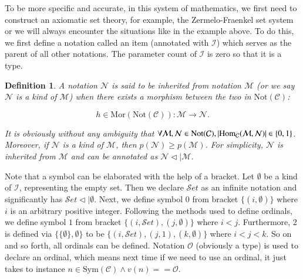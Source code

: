 \documentclass{aims}
\numberwithin{equation}{section}
\newtheorem{definition}{Definition}	%
\numberwithin{theorem}{section}	%
\numberwithin{axiom}{section}	%
\numberwithin{definition}{section}	%
\begin{document}
	To be more specific and accurate, in this system of mathematics, we first need to construct an axiomatic set theory, for example, the Zermelo-Fraenkel set system or we will always encounter the situations like in the example above. To do this, we first define a notation called an item (annotated with \(\mathcal{I}\)) which serves as the parent of all other notations. The parameter count of \(\mathcal{I}\) is zero so that it is a type.
	
	\begin{definition}
		A notation \(\mathcal{N}\) is said to be{ inherited} from notation \(\mathcal{M}\) (or we say \(\mathcal{N}\) is{ a kind of} \(\mathcal{M}\)) when there exists a morphism between the two in \(\text{Not}(\mathcal{C})\):
		
		\begin{equation}
			h\in \text{Mor}(\text{Not}(\mathcal{C})): \mathcal{M}\to \mathcal{N}.
		\end{equation}
		
		It is obviously without any ambiguity that \(\forall \mathcal{M},\mathcal{N}\in \text{Not}(\mathcal{C}),\left|\text{Hom}_{\mathcal{C}}(\mathcal{M},\mathcal{N})\right|$ $\in \{0,1\}\). Moreover, if \(\mathcal{N}\) is a kind of \(\mathcal{M}\), then \(\mathit{p}(\mathcal{N})\geq \mathit{p}(\mathcal{M})\). For simplicity, \(\mathcal{N}\) is inherited from \(\mathcal{M}\) and can be annotated as \(\mathcal{N}\triangleleft |\mathcal{M}\).
	\end{definition}
	
	Note that a symbol can be elaborated with the help of a bracket. Let \(\emptyset\) be a kind of \(\mathcal{I}\), representing the empty set. Then we declare \(\mathcal{S}\mathit{e}\mathit{t}\) as an infinite notation and significantly has \(\mathcal{S}\mathit{e}\mathit{t}\triangleleft |\emptyset\). Next, we define symbol \(0\) from bracket \(\{(i,\emptyset )\}\) where \(i\) is an arbitrary positive integer. Following the methods used to define ordinals, we define symbol \(1\) from bracket \(\{(i,\mathcal{S}\mathit{e}\mathit{t}),(j,\emptyset )\}\) where \(i<j\). Furthermore, 2 is defined via \(\{\{\emptyset \},\emptyset \}\) to be \(\{(i,\mathcal{S}\mathit{e}\mathit{t}),(j,1),(k,\emptyset )\}\) where \(i<j<k\). So on and so forth, all ordinals can be defined. Notation \(\mathcal{O}\) (obviously a type) is used to declare an ordinal, which means next time if we need to use an ordinal, it just takes to instance \(n\in \text{Sym}(\mathcal{C})\land \mathit{v}(n)==\mathcal{O}\).
	
\end{document}
